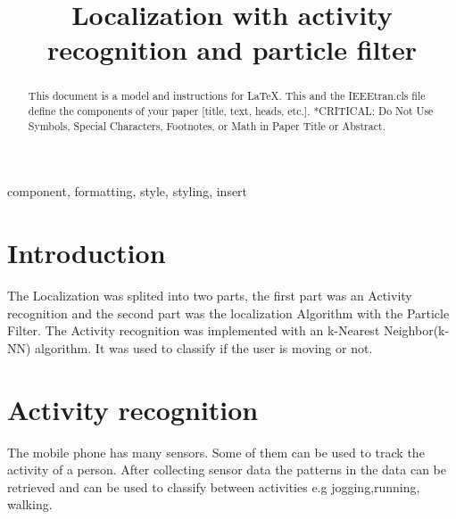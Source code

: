 \documentclass[conference]{IEEEtran}
\begin{document}
\title{Localization with activity recognition and particle filter\\}

\author{
\and
{}
}

\maketitle

\begin{abstract}
This document is a model and instructions for \LaTeX.
This and the IEEEtran.cls file define the components of your paper [title, text, heads, etc.]. *CRITICAL: Do Not Use Symbols, Special Characters, Footnotes, 
or Math in Paper Title or Abstract.
\end{abstract}

\begin{IEEEkeywords}
component, formatting, style, styling, insert
\end{IEEEkeywords}

\section{Introduction}
The Localization was splited into two parts, the first part was an Activity recognition and the second part was the localization Algorithm with the Particle Filter. The Activity recognition was implemented with an k-Nearest Neighbor(k-NN) algorithm. It was used to classify if the user is moving or not. 

\section{Activity recognition}
The mobile phone has many sensors. Some of them can be used to track the activity of a person.  After collecting sensor data the patterns in the data can be retrieved and can be used to classify between activities e.g jogging,running, walking.
\end{document}
